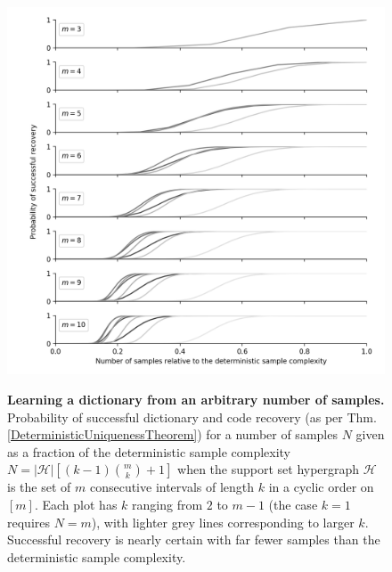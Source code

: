 \begin{figure}\label{probpigeon}
\begin{center}
\includegraphics[width=1 \linewidth]{figures/prob_vs_samples.png}
\caption{\textbf{Learning a dictionary from an arbitrary number of samples.} Probability of successful dictionary and code recovery (as per Thm. \ref{DeterministicUniquenessTheorem}) for a number of samples $N$ given as a fraction of the deterministic sample complexity $N = |\mathcal{H}|[(k-1){m \choose k} + 1]$ when the support set hypergraph $\mathcal{H}$ is the set of $m$ consecutive intervals of length $k$ in a cyclic order on $[m]$. Each plot has $k$ ranging from $2$ to $m-1$ (the case $k=1$ requires $N=m$), with lighter grey lines corresponding to larger $k$. Successful recovery is nearly certain with far fewer samples than the deterministic sample complexity. }
\vspace{-.6 cm}
\label{probvsamples}
\end{center}
\end{figure}

